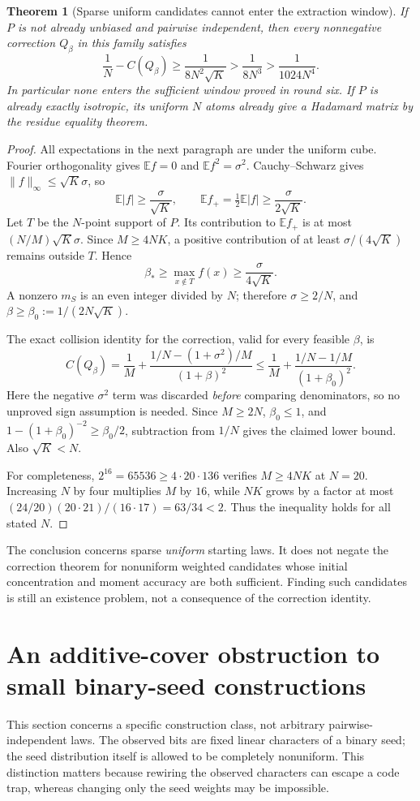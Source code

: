\documentclass[11pt]{article}
\newtheorem{theorem}{Theorem}[section]
\begin{document}
\begin{theorem}[Sparse uniform candidates cannot enter the extraction window]
\label{thm:minimal-buffer-obstruction}
If $P$ is not already unbiased and pairwise independent, then every
nonnegative correction $Q_\beta$ in this family satisfies
\[
 \frac1N-C(Q_\beta)\ge\frac1{8N^2\sqrt K}>
 \frac1{8N^3}>\frac1{1024N^4}.
\]
In particular none enters the sufficient window proved in round six.
If $P$ is already exactly isotropic, its uniform $N$ atoms already
give a Hadamard matrix by the residue equality theorem.
\end{theorem}
\begin{proof}
All expectations in the next paragraph are under the uniform cube.
Fourier orthogonality gives $\mathbb E f=0$ and
$\mathbb E f^2=\sigma^2$. Cauchy--Schwarz gives
$\|f\|_\infty\le\sqrt K\sigma$, so
\[
 \mathbb E|f|\ge\frac{\sigma}{\sqrt K},\qquad
 \mathbb E f_+=\tfrac12\mathbb E|f|
       \ge\frac{\sigma}{2\sqrt K}.
\]
Let $T$ be the $N$-point support of $P$. Its contribution to
$\mathbb E f_+$ is at most $(N/M)\sqrt K\sigma$.
Since $M\ge4NK$, a positive contribution of at least
$\sigma/(4\sqrt K)$ remains outside $T$. Hence
\[
 \beta_*\ge\max_{x\notin T}f(x)
          \ge\frac{\sigma}{4\sqrt K}.
\]
A nonzero $m_S$ is an even integer divided by $N$; therefore
$\sigma\ge2/N$, and
$\beta\ge\beta_0:=1/(2N\sqrt K)$.

The exact collision identity for the correction, valid for every
feasible $\beta$, is
\[
 C(Q_\beta)=\frac1M+
 \frac{1/N-(1+\sigma^2)/M}{(1+\beta)^2}
 \le\frac1M+\frac{1/N-1/M}{(1+\beta_0)^2}.
\]
Here the negative $\sigma^2$ term was discarded \emph{before}
comparing denominators, so no unproved sign assumption is needed.
Since $M\ge2N$, $\beta_0\le1$, and
$1-(1+\beta_0)^{-2}\ge\beta_0/2$, subtraction from $1/N$ gives
the claimed lower bound. Also $\sqrt K<N$.

For completeness, $2^{16}=65536\ge4\cdot20\cdot136$ verifies
$M\ge4NK$ at $N=20$. Increasing $N$ by four multiplies $M$ by
$16$, while $NK$ grows by a factor at most
$(24/20)(20\cdot21)/(16\cdot17)=63/34<2$.
Thus the inequality holds for all stated $N$.
\end{proof}

The conclusion concerns sparse \emph{uniform} starting laws. It does
not negate the correction theorem for nonuniform weighted candidates
whose initial concentration and moment accuracy are both sufficient.
Finding such candidates is still an existence problem, not a
consequence of the correction identity.
\section{An additive-cover obstruction to small binary-seed constructions}
\label{sec:character-rigidity}
This section concerns a specific construction class, not arbitrary
pairwise-independent laws. The observed bits are fixed linear
characters of a binary seed; the seed distribution itself is allowed
to be completely nonuniform. This distinction matters because
rewiring the observed characters can escape a code trap, whereas
changing only the seed weights may be impossible.
\end{document}
